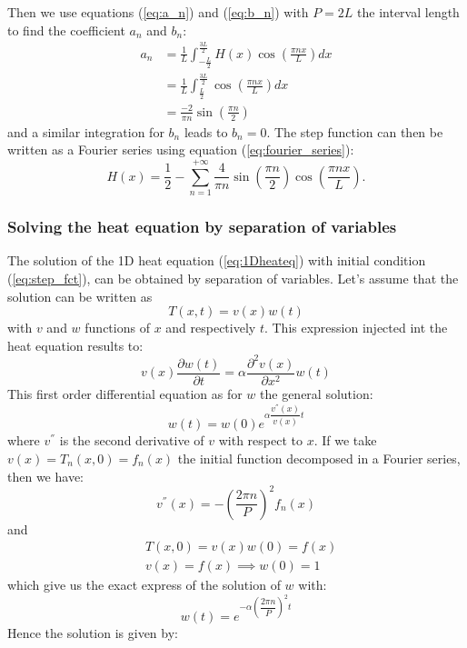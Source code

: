 Then we use equations (\ref{eq:a_n}) and (\ref{eq:b_n}) with $P=2L$ the interval length to find the coefficient $a_n$ and $b_n$:
\begin{align*}
    a_n &= \frac{1}{L} \int_{-\frac{L}{2}}^{\frac{3L}{2}} H(x) \cos\left(\frac{\pi n x}{L}\right) dx \\
    & = \frac{1}{L} \int_{\frac{L}{2}}^{\frac{3L}{2}} \cos\left(\frac{\pi n x}{L}\right) dx \\
    & = \frac{-2}{\pi n} \sin\left( \frac{\pi n}{2} \right)
\end{align*}
and a similar integration for $b_n$ leads to $b_n=0$.
The step function can then be written as a Fourier series using equation (\ref{eq:fourier_series}):
\begin{equation}
    H(x) = \frac{1}{2} - \sum_{n=1}^{+\infty} \frac{4}{\pi n} \sin\left(\frac{\pi n }{2} \right) \cos\left(\frac{\pi n x}{L}\right).
\end{equation}

\subsubsection{Solving the heat equation by separation of variables}

The solution of the 1D heat equation (\ref{eq:1Dheateq}) with initial condition (\ref{eq:step_fct}), can be obtained by separation of variables. Let's assume that the solution can be written as
\begin{equation}
    T(x, t) = v(x)w(t)
\end{equation}
with $v$ and $w$ functions of $x$ and respectively $t$. This expression injected int the heat equation results to:
\begin{equation}
   v(x) \dfrac{\partial w(t)}{\partial t} = \alpha  \dfrac{\partial^2 v(x)}{\partial x^2} w(t)
\end{equation}
This first order differential equation as for $w$ the general solution:
\begin{equation}
    w(t) = w(0) e^{\alpha \dfrac{v^{''}(x)}{v(x)} t}
\end{equation}
where $v^{''}$ is the second derivative of $v$ with respect to $x$. If we take $v(x) = T_n(x, 0) = f_n(x)$ the initial function decomposed in 
a Fourier series, then we have:
\begin{equation}
        v^{''}(x) = -\left(\frac{2 \pi n}{P} \right)^2 f_n(x)
\end{equation} 
and 
\begin{align*}
    & T(x, 0) = v(x)w(0) = f(x) \\
    & v(x) = f(x) \implies w(0) = 1
\end{align*}
which give us the exact express of the solution of $w$ with:
\begin{equation}
    w(t) = e^{-\alpha \left(\dfrac{2 \pi n}{P} \right)^2 t}
\end{equation}
Hence the solution is given by:

